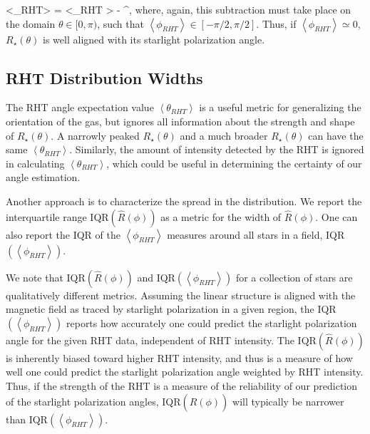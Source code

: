 \beq
\label{phi_RHT}
\left<\phi_{RHT}\right> =  \left<\theta_{RHT} \right> - \theta^\star,
\eeq
where, again, this subtraction must take place on the domain $\theta \in [0, \pi)$, such that $\left<\phi_{RHT}\right> \in [-\pi/2, \pi/2]$. Thus, if $\left<\phi_{RHT}\right> \simeq 0$, ${R_\star(\theta)}$ is well aligned with its starlight polarization angle.  \\

\subsection{RHT Distribution Widths}\label{distwidth}
The RHT angle expectation value ${\left<\theta_{RHT} \right>}$ is a useful metric for generalizing the orientation of the gas, but ignores all information about the strength and shape of $R_\star\left(\theta\right)$. A narrowly peaked $R_\star\left(\theta\right)$ and a much broader $R_\star\left(\theta\right)$ can have the same $\left<\theta_{RHT} \right>$. Similarly, the amount of intensity detected by the RHT is ignored in calculating $\left<\theta_{RHT} \right>$, which could be useful in determining the certainty of our angle estimation.

Another approach is to characterize the spread in the distribution. We report the interquartile range IQR$({\hat{R}(\phi)})$ as a metric for the width of ${\hat{R}(\phi)}$. One can also report the IQR of the $\left<\phi_{RHT}\right>$ measures around all stars in a field, IQR${\left(\left<\phi_{RHT}\right>\right)}$.

We note that IQR$({\hat{R}(\phi)})$ and IQR${\left(\left<\phi_{RHT}\right>\right)}$ for a collection of stars are qualitatively different metrics. Assuming the linear structure is aligned with the magnetic field as traced by starlight polarization in a given region, the IQR${\left(\left<\phi_{RHT} \right>\right)}$ reports how accurately one could predict the starlight polarization angle for the given RHT data, independent of RHT intensity. The IQR$({\hat{R}(\phi)})$ is inherently biased toward higher RHT intensity, and thus is a measure of how well one could predict the starlight polarization angle weighted by RHT intensity. Thus, if the strength of the RHT is a measure of the reliability of our prediction of the starlight polarization angles, IQR$({\hat{R}(\phi)})$ will typically be narrower than IQR${\left(\left<\phi_{RHT}\right>\right)}$.

